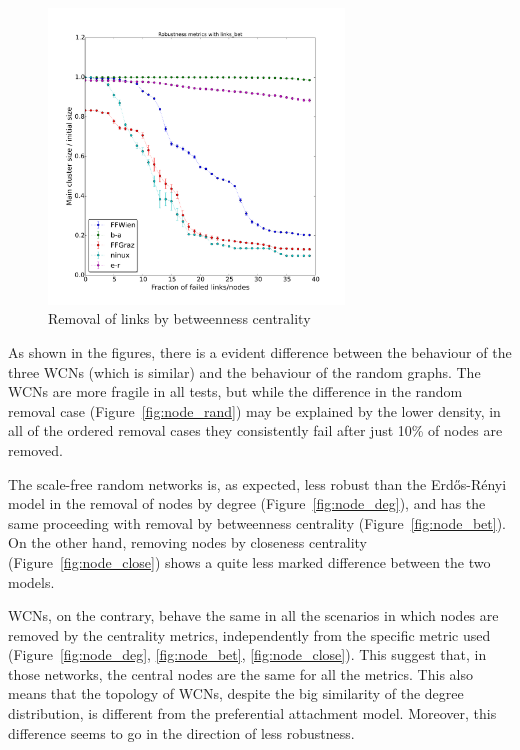 \documentclass[a4paper,11pt,twoside,openright]{memoir}
\newcommand{\figref}[1] {Figure~\ref{#1}}
\begin{document}
\begin{figure}[htbp]
\centering
\includegraphics[width=0.7\textwidth]{graphs/links_bet_robustness}
\caption{Removal of links by betweenness centrality}
\label{fig:link_bet}
\end{figure}

As shown in the figures, there is a evident difference between the
behaviour of the three WCNs (which is similar) and the behaviour of the
random graphs. The WCNs are more fragile in all tests, but while the
difference in the random removal case (\figref{fig:node_rand}) may be
explained by the lower density, in all of the ordered removal cases they
consistently fail after just 10\% of nodes are removed.

The scale-free random networks is, as expected, less robust than the
Erd\H{o}s-Rényi model in the removal of nodes by
degree (\figref{fig:node_deg}), and has the same proceeding with removal
by betweenness centrality (\figref{fig:node_bet}). On the
other hand, removing nodes by closeness centrality (\figref{fig:node_close})
shows a quite less marked difference between the two models.

WCNs, on the contrary, behave the same in all the scenarios in which
nodes are removed by the centrality metrics, independently from the specific
metric used
(\figref{fig:node_deg}, \ref{fig:node_bet}, \ref{fig:node_close}). This
suggest that, in those networks, the central nodes are the same for all
the metrics. This also means that the topology of WCNs, despite the big
similarity of the degree distribution, is different from the
preferential attachment model. Moreover, this difference seems to go in
the direction of less robustness.
\end{document}
